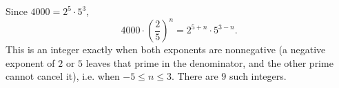 Since $4000=2^5\cdot5^3$,
\[4000\cdot\left(\dfrac25\right)^n=2^{5+n}\cdot5^{3-n}.\]
This is an integer exactly when both exponents are nonnegative (a negative exponent of $2$ or $5$ leaves that prime in the denominator, and the other prime cannot cancel it), i.e. when $-5\le n\le3$. There are $\boxed{9}$ such integers.
